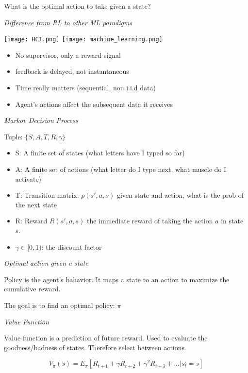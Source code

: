 What is the optimal action to take given a state? \smallskip


\textit{Difference from RL to other ML paradigms} \smallskip

\begin{minipage}{\linewidth} 
	\centering
	\texttt{[image: HCI.png]}
	\quad 
	\texttt{[image: machine\_learning.png]}
  \end{minipage}

\begin{itemize}[itemsep=-5pt, topsep=0pt, leftmargin=*]
	\item No supervisor, only a reward signal
	\item feedback is delayed, not instantaneous
	\item Time really matters (sequential, non i.i.d data)
	\item Agent's actions affect the subsequent data it receives
\end{itemize}

\textit{Markov Decision Process} \smallskip

Tuple: $\{S, A, T, R, \gamma\}$

\begin{itemize}[itemsep=-5pt, topsep=0pt, leftmargin=*]
	\item S: A finite set of states (what letters have I typed so far)
	\item A: A finite set of actions (what letter do I type next, what muscle do I activate)
	\item T: Transition matrix: $p(s', a, s)$ given state and action, what is the prob of the next state
	\item R: Reward $R(s', a, s)$ the immediate reward of taking the action $a$ in state $s$. 
	\item $\gamma \in [0, 1)$: the discount factor
\end{itemize}


\textit{Optimal action given a state} \smallskip

Policy is the agent's bahavior. It maps a state to an action to maximize the cumulative reward. 

The goal is to find an optimal policy: $\pi$ \smallbreak

\textit{Value Function} \smallskip

Value function is a prediction of future reward. Used to evaluate the goodness/badness of states. Therefore select between actions. 

$$V_{\pi}(s) = E_{\pi}[R_{t+1} + \gamma R_{t+2} + \gamma^2 R_{t+3} + ... | s_{t} = s]$$

